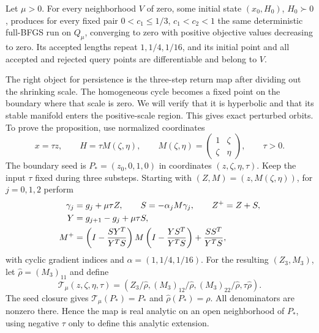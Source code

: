 \begin{proposition}\label{art:quadratic_failure}
Let $\mu>0$. For every neighborhood $V$ of zero, some initial state
$(x_0,H_0)$, $H_0\succ0$, produces for every fixed pair ${0<c_1\le1/3}$,
$c_1<c_2<1$ the same deterministic full-BFGS run on $Q_\mu$, converging to
zero with positive objective values decreasing to zero. Its accepted lengths
repeat $1,1/4,1/16$, and its initial point and all accepted and rejected query points are
differentiable and belong to $V$.
\end{proposition}

The right object for persistence is the three-step return map after
dividing out the shrinking scale. The homogeneous cycle becomes a fixed
point on the boundary where that scale is zero. We will verify that it
is hyperbolic and that its stable manifold enters the positive-scale
region. This gives exact perturbed orbits. To prove the proposition, use
normalized coordinates
\[
 x=\tau z,\qquad H=\tau M(\zeta,\eta),\qquad
 M(\zeta,\eta)=\begin{pmatrix}1&\zeta\\\zeta&\eta\end{pmatrix},\qquad\tau>0.
\]
The boundary seed is $P_*=(z_0,0,1,0)$ in coordinates $(z,\zeta,\eta,\tau)$.
Keep the input $\tau$ fixed during three substeps. Starting with
$(Z,M)=(z,M(\zeta,\eta))$, for $j=0,1,2$ perform
\begin{align}
 \gamma_j&=g_j+\mu\tau Z,\qquad S=-\alpha_jM\gamma_j,
       \qquad Z^+=Z+S,\label{art:lower_return_substep}\\
 Y&=g_{j+1}-g_j+\mu\tau S,\notag\\
 M^+&=\left(I-\frac{SY^T}{Y^TS}\right)M
          \left(I-\frac{YS^T}{Y^TS}\right)+\frac{SS^T}{Y^TS},\notag
\end{align}
with cyclic gradient indices and $\alpha=(1,1/4,1/16)$.
For the resulting $(Z_3,M_3)$, let $\hat\rho=(M_3)_{11}$ and define
\begin{equation}\label{art:lower_return}
 \mathcal T_\mu(z,\zeta,\eta,\tau)
 =\left(Z_3/\hat\rho, (M_3)_{12}/\hat\rho, (M_3)_{22}/\hat\rho, \tau\hat\rho\right).
\end{equation}
The seed closure gives $\mathcal T_\mu(P_*)=P_*$ and $\hat\rho(P_*)=\rho$.
All denominators are nonzero there. Hence the map is real analytic on an
open neighborhood of $P_*$, using negative $\tau$ only to define this
analytic extension.

